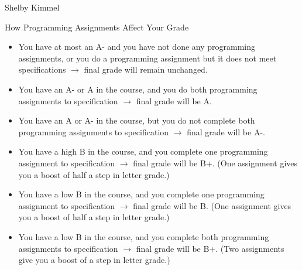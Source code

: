 \documentclass[11pt,landscape]{article}
\begin{document}
\hfill Shelby Kimmel

\begin{center}
{\huge How Programming Assignments Affect Your Grade}
\end{center}
\bigskip

\begin{itemize}
\item You have at most an A- and you have not done any programming assignments, or you do a programming assignment but it does not meet specifications $\rightarrow$ final grade will remain unchanged.
\item You have an A- or A in the course, and you do both programming assignments to specification $\rightarrow$ final grade will be A.
\item You have an A or A- in the course, but you do not complete both programming assignments to specification $\rightarrow$ final grade will be A-.
\item You have a high B in the course, and you complete one programming assignment to specification $\rightarrow$ final grade will be B+. (One assignment gives you a boost of half a step in letter grade.)
\item You have a low B in the course, and you complete one programming assignment to specification $\rightarrow$ final grade will be B. (One assignment gives you a boost of half a step in letter grade.)
\item You have a low B in the course, and you complete both programming assignments to specification $\rightarrow$ final grade will be B+. (Two assignments give you a boost of a step in letter grade.)
\end{itemize}
\end{document}
